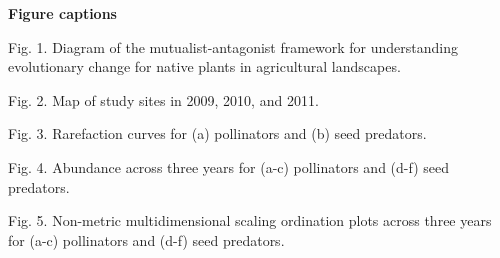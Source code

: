 \documentclass[12pt]{article}
\begin{document}
\newpage 
%

 

\newpage 
\textbf{Figure captions}

Fig. 1.  Diagram of the mutualist-antagonist framework for understanding evolutionary change for native plants in agricultural landscapes.  

Fig. 2.  Map of study sites in 2009, 2010, and 2011.  

Fig. 3.  Rarefaction curves for (a) pollinators and (b) seed predators. 

Fig. 4.  Abundance across three years for (a-c) pollinators and (d-f) seed predators. 

Fig. 5.  Non-metric multidimensional scaling ordination plots across three years for (a-c) pollinators and (d-f) seed predators. 
\end{document}
